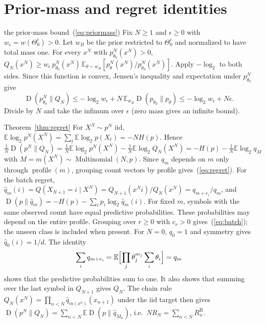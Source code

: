 \documentclass[anon]{alt2027}
\newcommand{\batchreg}{R^{\mathrm{B}}}
\newcommand{\Mult}{\operatorname{Multinomial}}
\newcommand{\profile}{\operatorname{profile}}
\newcommand{\E}{\mathbb{E}}
\newcommand{\KL}{\operatorname{D}}
\renewcommand{\eqref}[1]{(\ref{#1})}
\begin{document}


\clearpage
\appendix

\section{Prior-mass and regret identities}
\label{app:regret}

\begin{proofof}{the prior-mass bound~\eqref{eq:priormass}}
Fix $N\ge1$ and $\epsilon\ge0$ with $w_\epsilon=w(\Theta_0^\epsilon)>0$. Let $w_B$ be the prior restricted to $\Theta_0^\epsilon$ and normalized to have total mass one. For every $x^N$ with $p^N_{\theta_0}(x^N)>0$, $Q_N(x^N)\ge w_\epsilon\,p^N_{\theta_0}(x^N)\,\E_{\theta\sim w_B}[p^N_\theta(x^N)/p^N_{\theta_0}(x^N)]$. Apply $-\log_2$ to both sides. Since this function is convex, Jensen's inequality and expectation under $p^N_{\theta_0}$ give \[\KL(p^N_{\theta_0}\|Q_N)\le-\log_2w_\epsilon+N\,\E_{w_B}\KL(p_{\theta_0}\|p_\theta)\le-\log_2w_\epsilon+N\epsilon.\] Divide by $N$ and take the infimum over $\epsilon$ (zero mass gives an infinite bound).
\end{proofof}

\begin{proofof}{Theorem~\ref{thm:regret}}
For $X^N\sim p^N$ iid, $\E\log_2 p^N(X^N)=\sum_t\E\log_2p(X_t)=-NH(p)$. Hence
$\frac1N\KL(p^N\|Q_N)=\frac1N\E\log_2p^N(X^N)-\frac1N\E\log_2Q_N(X^N)=-H(p)-\frac1N\E\log_2 q_{M}$ with $M=m(X^N)\sim\Mult(N,p)$. Since $q_m$ depends on $m$ only through $\profile(m)$, grouping count vectors by profile gives~\eqref{eq:regret}. For the batch regret, $\hat q_m(i)=Q(X_{N+1}=i\mid X^N)=Q_{N+1}(x^N i)/Q_N(x^N)=q_{m+e_i}/q_m$, and $\KL(p\|\hat q_m)=-H(p)-\sum_ip_i\log_2\hat q_m(i)$. For fixed $m$, symbols with the same observed count have equal predictive probabilities. These probabilities may depend on the entire profile. Grouping over $r\ge0$ with $c_r>0$ gives~\eqref{eq:batch}; the unseen class is included when present. For $N=0$, $q_0=1$ and symmetry gives $\hat q_0(i)=1/d$. The identity \[\sum_iq_{m+e_i}=\E\Bigl[\prod_j\theta_j^{m_j}\sum_i\theta_i\Bigr]=q_m\] shows that the predictive probabilities sum to one. It also shows that summing over the last symbol in $Q_{N+1}$ gives $Q_N$. The chain rule $Q_N(x^N)=\prod_{n<N}\hat q_{m(x^n)}(x_{n+1})$ under the iid target then gives $\KL(p^N\|Q_N)=\sum_{n<N}\E\KL(p\|\hat q_{M_n})$, i.e.\ $NR_N=\sum_{n<N}\batchreg_n$.
\end{proofof}
\end{document}
